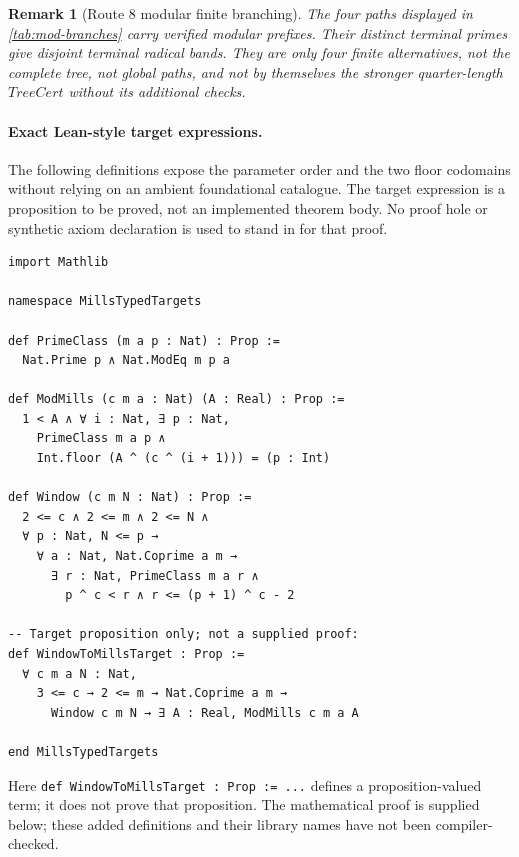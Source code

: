 \documentclass[11pt,reqno]{amsart}
\makeatletter
\theoremstyle{blueplain}
\newtheorem{remark}{Remark}[section]
\newcommand{\defref}[1]{\hyperref[#1]{Definition~\ref*{#1}}}
\numberwithin{equation}{section}
\DeclareRobustCommand{\defref}[1]{%
  \hyperlink{def:#1}{\ensuremath{\csname PredicateName@#1\endcsname}}}
\def\defref#1{#1}%
\def\hyperlink#1#2{#2}}
\makeatother
\begin{document}
\begin{remark}[Route 8 modular finite branching]
The four paths displayed in \cref{tab:mod-branches} carry verified modular
prefixes. Their distinct terminal primes give disjoint terminal radical
bands. They are only four finite alternatives, not the complete tree,
not global paths, and not by themselves the stronger quarter-length
\(\defref{TreeCert}\) without its additional checks.
\end{remark}

\paragraph{Exact Lean-style target expressions.}
The following definitions expose the parameter order and the two floor
codomains without relying on an ambient foundational catalogue. The target
expression is a proposition to be proved, not an implemented theorem body.
No proof hole or synthetic axiom declaration is used to stand in for that proof.
\begin{lstlisting}[style=lean,basicstyle=\ttfamily\scriptsize]
import Mathlib

namespace MillsTypedTargets

def PrimeClass (m a p : Nat) : Prop :=
  Nat.Prime p ∧ Nat.ModEq m p a

def ModMills (c m a : Nat) (A : Real) : Prop :=
  1 < A ∧ ∀ i : Nat, ∃ p : Nat,
    PrimeClass m a p ∧
    Int.floor (A ^ (c ^ (i + 1))) = (p : Int)

def Window (c m N : Nat) : Prop :=
  2 <= c ∧ 2 <= m ∧ 2 <= N ∧
  ∀ p : Nat, N <= p →
    ∀ a : Nat, Nat.Coprime a m →
      ∃ r : Nat, PrimeClass m a r ∧
        p ^ c < r ∧ r <= (p + 1) ^ c - 2

-- Target proposition only; not a supplied proof:
def WindowToMillsTarget : Prop :=
  ∀ c m a N : Nat,
    3 <= c → 2 <= m → Nat.Coprime a m →
      Window c m N → ∃ A : Real, ModMills c m a A

end MillsTypedTargets
\end{lstlisting}
Here \texttt{def WindowToMillsTarget : Prop := ...} defines a proposition-valued term;
it does not prove that proposition. The mathematical proof is supplied below;
these added definitions and their library names have not been compiler-checked.
\end{document}
